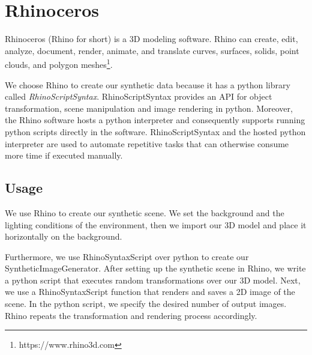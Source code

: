 \section{Rhinoceros}
Rhinoceros (Rhino for short) is a 3D modeling software. Rhino can create, edit, analyze, document, render, animate, and translate curves, surfaces, solids, point clouds, and polygon meshes\footnote{https://www.rhino3d.com}.

We choose Rhino to create our synthetic data because it has a python library called \textit{RhinoScriptSyntax}. RhinoScriptSyntax provides an API for object transformation, scene manipulation and image rendering in python. Moreover, the Rhino software hosts a python interpreter and consequently supports running python scripts directly in the software. RhinoScriptSyntax and the hosted python interpreter are used to automate repetitive tasks that can otherwise consume more time if executed manually.

\subsection{Usage}
We use Rhino to create our synthetic scene. We set the background and the lighting conditions of the environment, then we import our 3D model and place it horizontally on the background.

Furthermore, we use RhinoSyntaxScript over python to create our SyntheticImageGenerator. After setting up the synthetic scene in Rhino, we write a python script that executes random transformations over our 3D model. Next, we use a RhinoSyntaxScript function that renders and saves a 2D image of the scene. In the python script, we specify the desired number of output images. Rhino repeats the transformation and rendering process accordingly.
